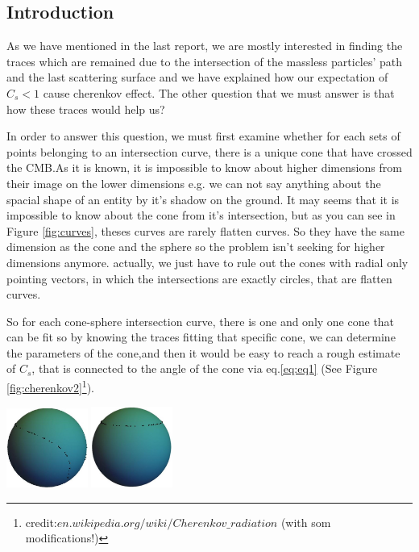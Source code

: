 \documentclass[a4paper,12pt]{article}
\begin{document}
\begin{multicols}{2}
\section{Introduction}
As we have mentioned in the last report, we are mostly interested in finding the traces which are remained due to the intersection of the massless particles' path and the last scattering surface and we have explained how our expectation of $C_s<1$ cause cherenkov effect. The other question that we must answer is that how these traces would help us?

In order to answer this question, we must first examine whether for each sets of points belonging to an intersection curve, there is a unique cone that have crossed the CMB.As it is known, it is impossible to know about higher dimensions from their image on the lower dimensions e.g. we can not say anything about the spacial shape of an entity by it's shadow on the ground. It may seems that it is impossible to know about the cone from it's intersection, but as you can see in Figure \ref{fig:curves}, theses curves are rarely flatten curves. So they have the same dimension as the cone and the sphere so the problem isn't seeking for higher dimensions anymore. actually, we just have to rule out the cones with radial only pointing vectors, in which the intersections are exactly circles, that are flatten curves.

So for each cone-sphere intersection curve, there is one and only one cone that can be fit so by knowing the traces fitting that specific cone, we can determine the parameters of the cone,and then it would be easy to reach a rough estimate of $C_s$, that is connected to the angle of the cone via eq.\eqref{eq:eq1} (See Figure \ref{fig:cherenkov2}\footnote{credit:$en.wikipedia.org/wiki/Cherenkov\_radiation$ (with som modifications!)}).

\includegraphics[width=0.2\textwidth]{c2.jpg}
\includegraphics[width=0.2\textwidth]{c41.jpg}
\label{fig:curves}


\end{multicols}
\end{document}

